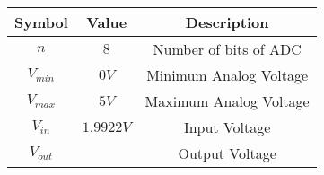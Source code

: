 \begin{tabular}{|c|c|c|}
    \hline
       \textbf{Symbol}  & \textbf{Value} & \textbf{Description}\\
    \hline
        $n$  &  $8$ &  Number of bits of ADC\\
    \hline
        $V_{min}$ & $0V$ & Minimum Analog Voltage\\
    \hline
        $V_{max}$ & $5V$ & Maximum Analog Voltage\\
    \hline
        $V_{in}$ & $1.9922 V$ & Input Voltage\\
    \hline
        $V_{out}$ & & Output Voltage\\
    \hline
\end{tabular}
